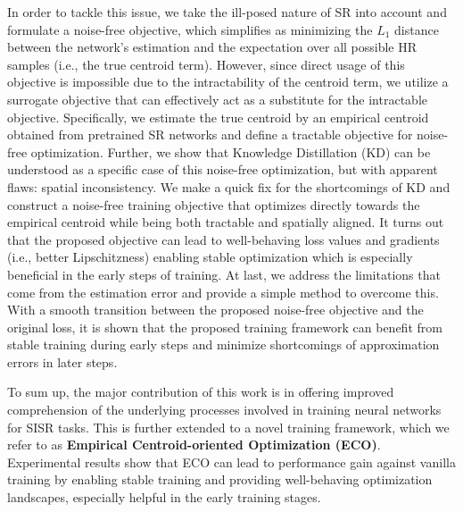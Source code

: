 \documentclass[letterpaper]{article} %
\begin{document}
In order to tackle this issue, we take the ill-posed nature of SR into account and formulate a noise-free objective, which simplifies as minimizing the $L_1$ distance between the network's estimation and the expectation over all possible HR samples (i.e., the true centroid term). However, since direct usage of this objective is impossible due to the intractability of the centroid term, we utilize a surrogate objective that can effectively act as a substitute for the intractable objective. Specifically, we estimate the true centroid by an empirical centroid obtained from pretrained SR networks and define a tractable objective for noise-free optimization. Further, we show that Knowledge Distillation (KD) can be understood as a specific case of this noise-free optimization, but with apparent flaws: spatial inconsistency. We make a quick fix for the shortcomings of KD and construct a noise-free training objective that optimizes directly towards the empirical centroid while being both tractable and spatially aligned. It turns out that the proposed objective can lead to well-behaving loss values and gradients (i.e., better Lipschitzness) enabling stable optimization which is especially beneficial in the early steps of training.  At last, we address the limitations that come from the estimation error and provide a simple method to overcome this. With a smooth transition between the proposed noise-free objective and the original loss, it is shown that the proposed training framework can benefit from stable training during early steps and minimize shortcomings of approximation errors in later steps.

To sum up, the major contribution of this work is in offering improved comprehension of the underlying processes involved in training neural networks for SISR tasks. This is further extended to a novel training framework, which we refer to as \textbf{Empirical Centroid-oriented Optimization (ECO)}. Experimental results show that ECO can lead to performance gain against vanilla training by enabling stable training and providing well-behaving optimization landscapes, especially helpful in the early training stages.







\end{document}
